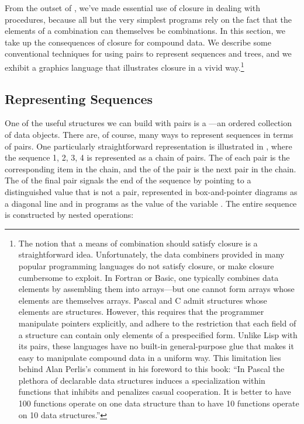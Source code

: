 From the outset of , we've made essential use of closure in
dealing with procedures, because all but the very simplest programs rely on the
fact that the elements of a combination can themselves be combinations.  In
this section, we take up the consequences of closure for compound data.  We
describe some conventional techniques for using pairs to represent sequences
and trees, and we exhibit a graphics language that illustrates closure in a
vivid way.\footnote{The notion that a means of combination should satisfy
closure is a straightforward idea.  Unfortunately, the data combiners provided
in many popular programming languages do not satisfy closure, or make closure
cumbersome to exploit.  In Fortran or Basic, one typically combines data
elements by assembling them into arrays---but one cannot form arrays whose
elements are themselves arrays.  Pascal and C admit structures whose elements
are structures.  However, this requires that the programmer manipulate pointers
explicitly, and adhere to the restriction that each field of a structure can
contain only elements of a prespecified form.  Unlike Lisp with its pairs,
these languages have no built-in general-purpose glue that makes it easy to
manipulate compound data in a uniform way.  This limitation lies behind Alan
Perlis's comment in his foreword to this book: ``In Pascal the plethora of
declarable data structures induces a specialization within functions that
inhibits and penalizes casual cooperation.  It is better to have 100 functions
operate on one data structure than to have 10 functions operate on 10 data
structures.''}



\subsection{Representing Sequences}
\label{Section 2.2.1}

One of the useful structures we can build with pairs is a
---an ordered collection of data objects.  There are, of
course, many ways to represent sequences in terms of pairs.  One particularly
straightforward representation is illustrated in , where the
sequence 1, 2, 3, 4 is represented as a chain of pairs.  The  of each
pair is the corresponding item in the chain, and the  of the pair is
the next pair in the chain.  The  of the final pair signals the end
of the sequence by pointing to a distinguished value that is not a pair,
represented in box-and-pointer diagrams as a diagonal line and in programs as
the value of the variable .  The entire sequence is constructed by
nested  operations:


